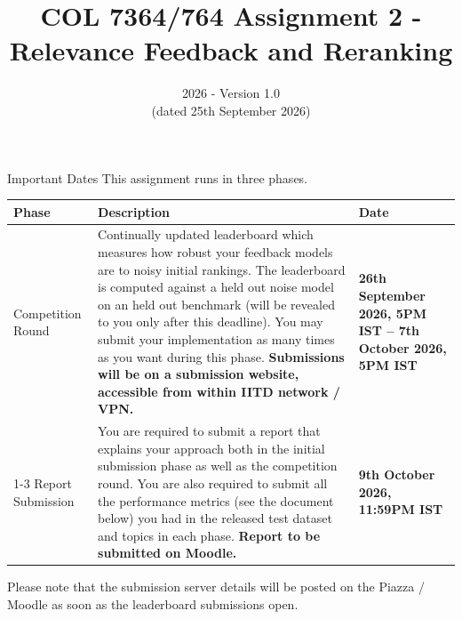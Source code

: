 \documentclass[10pt]{article}
\begin{document}
\title{COL 7364/764 Assignment 2 - Relevance Feedback and Reranking}
\date{2026 - Version 1.0 \\(dated 25th September 2026)}
\maketitle
\noindent
\begin{mybox}{Important Dates} 
This assignment runs in three phases. 
\begin{center}
\begin{tabular}{l p{8cm} p{3cm} }
\toprule
\textbf{Phase} & \textbf{Description} & \textbf{Date} \\
\midrule
Competition Round & Continually updated leaderboard which measures how robust your feedback models are to noisy initial rankings. The leaderboard is computed against a held out noise model on an held out benchmark (will be revealed to you only after this deadline). You may submit your implementation as many times as you want during this phase. \textbf{Submissions will be on a submission website, accessible from within IITD network / VPN.} & \textbf{26th September 2026, 5PM IST -- 7th October 2026, 5PM IST} \\ 
\cmidrule(lr){1-3}
Report Submission & You are required to submit a report that explains your approach both in the initial submission phase as well as the competition round. You are also required to submit all the performance metrics (see the document below) you had in the released test dataset and topics in each phase. \textbf{Report to be submitted on Moodle.} &  \textbf{9th October 2026, 11:59PM IST} \\ 
\bottomrule
\end{tabular}
\end{center}
Please note that the submission server details will be posted on the Piazza / Moodle as soon as the leaderboard submissions open.
\end{mybox}
\end{document}
